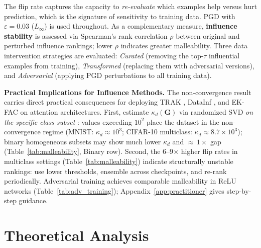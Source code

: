 \documentclass{article}
\theoremstyle{plain}
\theoremstyle{definition}
\theoremstyle{remark}
\begin{document}
The flip rate captures the capacity to \emph{re-evaluate} which examples help versus hurt prediction, which is the signature of sensitivity to training data. PGD with $\varepsilon = 0.03$ ($L_\infty$) is used throughout. As a complementary measure, \textbf{influence stability} is assessed via Spearman's rank correlation $\rho$ between original and perturbed influence rankings; lower $\rho$ indicates greater malleability. Three data intervention strategies are evaluated: \emph{Curated} (removing the top-$\tau$ influential examples from training), \emph{Transformed} (replacing them with adversarial versions), and \emph{Adversarial} (applying PGD perturbations to all training data).

\textbf{Practical Implications for Influence Methods.}
The non-convergence result carries direct practical consequences for deploying TRAK \citep{park2023trak}, DataInf \citep{kwon2023datainf}, and EK-FAC \citep{grosse2023ekfac} on attention architectures. First, estimate $\kappa_d(\mathbf{G})$ via randomized SVD \emph{on the specific class subset} \citep{halko2011finding}: values exceeding $10^2$ place the dataset in the non-convergence regime (MNIST: $\kappa_d \approx 10^3$; CIFAR-10 multiclass: $\kappa_d \approx 8.7\times 10^3$); binary homogeneous subsets may show much lower $\kappa_d$ and ${\approx}\,1\times$ gap (Table~\ref{tab:malleability}, Binary row). Second, the 6--9$\times$ higher flip rates in multiclass settings (Table~\ref{tab:malleability}) indicate structurally unstable rankings: use lower thresholds, ensemble across checkpoints, and re-rank periodically. Adversarial training achieves comparable malleability in ReLU networks (Table~\ref{tab:adv_training}); Appendix~\ref{app:practitioner} gives step-by-step guidance.

\section{Theoretical Analysis}
\label{sec:theory}
\end{document}

